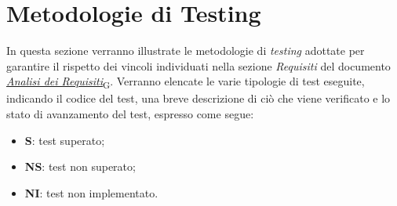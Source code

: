 \section{Metodologie di Testing}
In questa sezione verranno illustrate le metodologie di \textit{testing} adottate per garantire il rispetto dei vincoli individuati nella sezione \textit{Requisiti} del documento \href{https://7last.github.io/docs/rtb/documentazione-esterna/analisi-dei-requisiti}{\href{https://7last.github.io/docs/rtb/documentazione-interna/glossario\#analisi-dei-requisiti}{\textit{Analisi dei Requisiti}\textsubscript{G}}}.
Verranno elencate le varie tipologie di test eseguite, indicando il codice del test, una breve descrizione di ciò che viene verificato e lo stato di avanzamento del test, espresso come segue:
\begin{itemize}
	\item \textbf{S}: test superato;
	\item \textbf{NS}: test non superato;
	\item \textbf{NI}: test non implementato.
\end{itemize}

